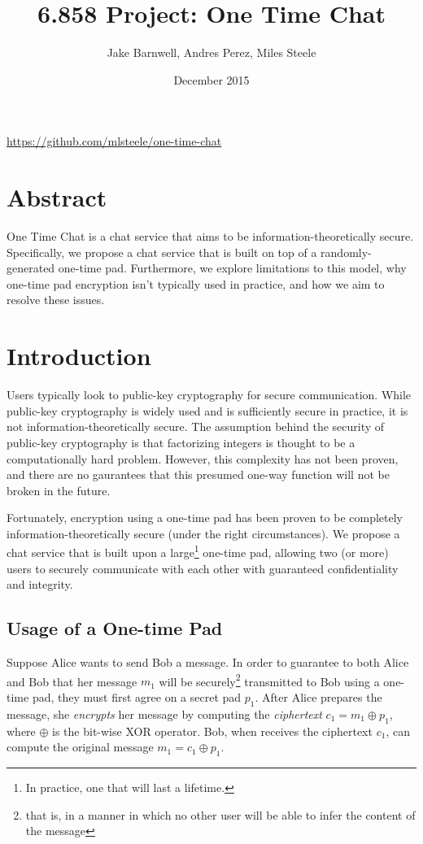 \documentclass[twocolumn]{article}
\title{6.858 Project: One Time Chat}
\author{Jake Barnwell, Andres Perez, Miles Steele}
\date{December 2015}
\begin{document}
\maketitle
\url{https://github.com/mlsteele/one-time-chat}

\section{Abstract}
One Time Chat is a chat service that aims to be information-theoretically secure. Specifically, we propose a chat service that is built on top of a randomly-generated one-time pad. Furthermore, we explore limitations to this model, why one-time pad encryption isn't typically used in practice, and how we aim to resolve these issues.

\section{Introduction}
Users typically look to public-key cryptography for secure communication. While public-key cryptography is widely used and is sufficiently secure in practice, it is not information-theoretically secure. The assumption behind the security of public-key cryptography is that factorizing integers is thought to be a computationally hard problem. However, this complexity has not been proven, and there are no gaurantees that this presumed one-way function will not be broken in the future.
 
Fortunately, encryption using a one-time pad has been proven to be completely information-theoretically secure (under the right circumstances). We propose a chat service that is built upon a large\footnote{
In practice, one that will last a lifetime.
}
one-time pad, allowing two (or more) users to securely communicate with each other with guaranteed confidentiality and integrity.

\subsection{Usage of a One-time Pad}
Suppose Alice wants to send Bob a message. In order to guarantee to both Alice and Bob that her message $m_1$ will be securely\footnote{
that is, in a manner in which no other user will be able to infer the content of the message
}
transmitted to Bob using a one-time pad, they must first agree on a secret pad $p_{1}$. After Alice prepares the message, she \emph{encrypts} her message by computing the \emph{ciphertext} $c_{1} = m_{1} \oplus p_{1}$, where $\oplus$ is the bit-wise XOR operator. Bob, when receives the ciphertext $c_1$, can compute the original message $m_1 = c_1 \oplus p_1$.
\end{document}
